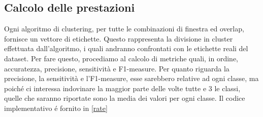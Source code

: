 \subsection{Calcolo delle prestazioni}
Ogni algoritmo di clustering, per tutte le combinazioni di finestra ed overlap, fornisce un vettore di etichette. Questo rappresenta la divisione in cluster effettuata dall'algoritmo, i quali andranno confrontati con le etichette reali del dataset. Per fare questo, procediamo al calcolo di metriche quali, in ordine, accuratezza, precisione, sensitività e F1-measure. Per quanto riguarda la precisione, la sensitività e l'F1-measure, esse sarebbero relative ad ogni classe, ma poiché ci interessa indovinare la maggior parte delle volte tutte e 3 le classi, quelle che saranno riportate sono la media dei valori per ogni classe. Il codice implementativo é fornito in \ref{rate}

